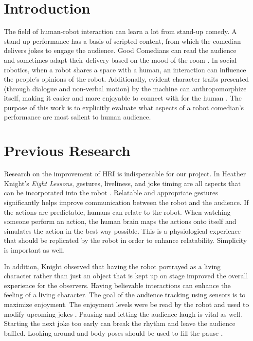 \documentclass[onecolumn, draftclsnofoot,10pt, compsoc]{IEEEtran}
\begin{document}
\section{Introduction}
The field of human-robot interaction can learn a lot from stand-up comedy. A stand-up performance has a basis of scripted content, from which the comedian delivers jokes to engage the audience. Good Comedians can read the audience and sometimes adapt their delivery based on the mood of the room \cite{talkingFunny}. In social robotics, when a robot shares a space with a human, an interaction can influence the people's opinions of the robot. Additionally, evident character traits presented (through dialogue and non-verbal motion) by the machine can anthropomorphize itself, making it easier and more enjoyable to connect with for the human \cite{KnightEightLessons:2011}. The purpose of this work is to explicitly evaluate what aspects of a robot comedian's performance are most salient to human audience.


\section{Previous Research}

Research on the improvement of HRI is indispensable for our project. In Heather Knight's \textit{Eight Lessons}, gestures, liveliness, and joke timing are all aspects that can be incorporated into the robot {\cite{KnightEightLessons:2011}}.
Relatable and appropriate gestures significantly helps improve communication between the robot and the audience. If the actions are predictable, humans can relate to the robot.
When watching someone perform an action, the human brain maps the actions onto itself and simulates the action in the best way possible. This is a physiological experience that should be replicated by the robot in order to enhance relatability. Simplicity is important as well. {\cite{KnightEightLessons:2011}}

In addition, Knight observed that having the robot portrayed as a living character rather than just an object that is kept up on stage improved the overall experience for the observers. Having believable interactions can enhance the feeling of a living character.
The goal of the audience tracking using sensors is to maximize enjoyment. The enjoyment levels were be read by the robot and used to modify upcoming jokes {\cite{KnightEightLessons:2011}}. Pausing and letting the audience laugh is vital as well. Starting the next joke too early can break the rhythm and leave the audience baffled. Looking around and body poses should be used to fill the pause {\cite{KnightEightLessons:2011}}.
\end{document}
